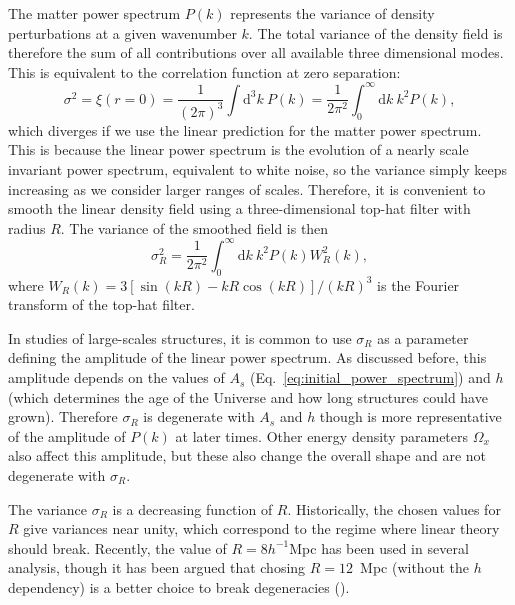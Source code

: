     The matter power spectrum $P(k)$ represents the variance of density perturbations 
    at a given wavenumber $k$. The total variance of the density field is therefore 
    the sum of all contributions over all available three dimensional modes. 
    This is equivalent to the correlation function at zero separation:
    \begin{equation}
        \sigma^2 = \xi(r=0) = \frac{1}{(2\pi)^3}\int \mathrm{d}^3k ~ P(k) = \frac{1}{2\pi^2} \int_0^\infty \mathrm{d}k ~k^2 P(k), 
        \label{eq:variance_linear_field}
    \end{equation} 
    which diverges if we use the linear prediction for the matter power spectrum.
    This is because the linear power spectrum is the evolution of a nearly scale 
    invariant power spectrum, equivalent to white noise, so the variance simply 
    keeps increasing as we consider larger ranges of scales. Therefore, it is 
    convenient to smooth the linear density field using a three-dimensional 
    top-hat filter with radius $R$. The variance of the smoothed field is 
    then 
    \begin{equation}
        \sigma_R^2 = \frac{1}{2\pi^2} \int_0^\infty \mathrm{d}k ~k^2 P(k) W_R^2(k),
        \label{eq:variance_linear_field_smoothed}
    \end{equation}
    where $W_R(k) = 3[\sin(kR) - kR \cos(kR)]/(kR)^3$ is the Fourier transform of the
    top-hat filter. 

    In studies of large-scales structures, it is common to use $\sigma_R$ 
    as a parameter defining the amplitude of the linear power spectrum. 
    As discussed before, this amplitude depends on the values of $A_s$ (Eq.~\ref{eq:initial_power_spectrum})
    and $h$ (which determines the age of the Universe and how long structures could have grown).
    Therefore $\sigma_R$ is degenerate with $A_s$ and $h$ though is more representative of
    the amplitude of $P(k)$ at later times.  
    Other energy density parameters $\Omega_x$ also affect this amplitude, but these
    also change the overall shape and are not degenerate with $\sigma_R$. 

    The variance $\sigma_R$ is a decreasing function of $R$. Historically, 
    the chosen values for $R$ give variances near unity, which correspond to 
    the regime where linear theory should break.   
    Recently, the value of $R = 8h^{-1}$Mpc has been used in several analysis, 
    though it has been argued that chosing $R = 12$~Mpc (without the $h$ dependency)
    is a better choice to break degeneracies (\cite{sanchezArgumentsUsingMpc2020}).

